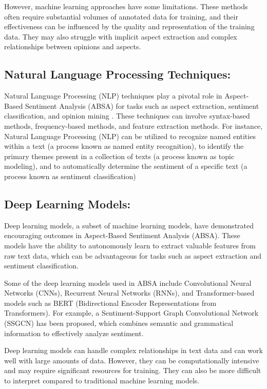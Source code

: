\documentclass{article}
\begin{document}
However, machine learning approaches have some limitations. These methods often require substantial volumes of annotated data for training, and their effectiveness can be influenced by the quality and representation of the training data. They may also struggle with implicit aspect extraction and complex relationships between opinions and aspects\cite{Adagale2023AspectBS}.

\subsection{Natural Language Processing Techniques:}
Natural Language Processing (NLP) techniques play a pivotal role in Aspect-Based Sentiment Analysis (ABSA) for tasks such as aspect extraction, sentiment classification, and opinion mining \cite{rocca2023natural}\cite{Adagale2023AspectBS}. These techniques can involve syntax-based methods, frequency-based methods, and feature extraction methods\cite{Adagale2023AspectBS}. For instance, Natural Language Processing (NLP) can be utilized to recognize named entities within a text (a process known as named entity recognition), to identify the primary themes present in a collection of texts (a process known as topic modeling), and to automatically determine the sentiment of a specific text (a process known as sentiment classification) \cite{rocca2023natural}

\subsection{Deep Learning Models: }
Deep learning models, a subset of machine learning models, have demonstrated encouraging outcomes in Aspect-Based Sentiment Analysis (ABSA). These models have the ability to autonomously learn to extract valuable features from raw text data, which can be advantageous for tasks such as aspect extraction and sentiment classification.\cite{Kumar2023AspectBasedSA} \cite{Dhanith2023ACE}

Some of the deep learning models used in ABSA include Convolutional Neural Networks (CNNs), Recurrent Neural Networks (RNNs), and Transformer-based models such as BERT (Bidirectional Encoder Representations from Transformers)\cite{Dhanith2023ACE}\cite{Kumar2023AspectBasedSA}. For example, a Sentiment-Support Graph Convolutional Network (SSGCN) has been proposed, which combines semantic and grammatical information to effectively analyze sentiment. \cite{Dhanith2023ACE}

Deep learning models can handle complex relationships in text data and can work well with large amounts of data. However, they can be computationally intensive and may require significant resources for training. They can also be more difficult to interpret compared to traditional machine learning models\cite{Kumar2023AspectBasedSA}\cite{Dhanith2023ACE}.
\end{document}
